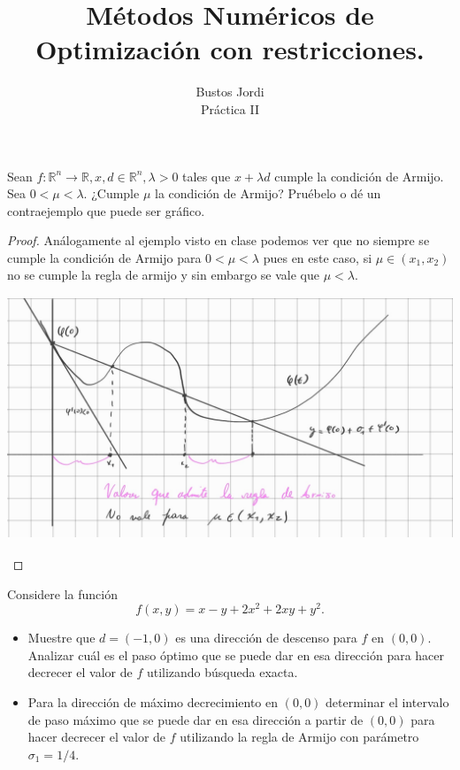 \documentclass{article}
\newenvironment{theorem}[2][Ejercicio]{\begin{trivlist}
\item[\hskip \labelsep {\bfseries #1}\hskip \labelsep {\bfseries #2.}]}{\end{trivlist}}
\begin{document}
\title{Métodos Numéricos de Optimización con restricciones.}
\author{Bustos Jordi\\Práctica II}

\maketitle

\begin{theorem}{1}
    Sean \(f : \mathbb{R}^n \to \mathbb{R}, x, d \in \mathbb{R}^n, \lambda > 0\) tales que
    \(x + \lambda d\) cumple la condición de Armijo. Sea \(0 < \mu < \lambda \).
    ¿Cumple \(\mu \) la condición de Armijo? Pruébelo o dé un contraejemplo que puede ser gráfico.
\end{theorem}

\begin{proof}
    Análogamente al ejemplo visto en clase podemos ver que no siempre se cumple la condición de Armijo para \( 0 < \mu < \lambda \) pues en este caso, si
    \( \mu \in (x_1, x_2) \) no se cumple la regla de armijo y sin embargo se vale que \( \mu < \lambda \). \\
    \includegraphics[width=14cm, height=8cm]{media/p2ej1.jpeg}
\end{proof}

\vspace{0.25in}

\begin{theorem}{2}
    Considere la función
    \[
        f(x,y) = x - y + 2x^2 + 2xy + y^2.
    \]

    \begin{itemize}
        \item[(a)] Muestre que \(d = (-1,0)\) es una dirección de descenso para \(f\) en \((0,0)\).
              Analizar cuál es el paso óptimo que se puede dar en esa dirección para hacer decrecer el
              valor de \(f\) utilizando búsqueda exacta.

        \item[(b)] Para la dirección de máximo decrecimiento en \((0,0)\) determinar el intervalo
              de paso máximo que se puede dar en esa dirección a partir de \((0,0)\) para hacer decrecer
              el valor de \(f\) utilizando la regla de Armijo con parámetro \(\sigma_1 = 1/4\).
    \end{itemize}
\end{theorem}
\end{document}
